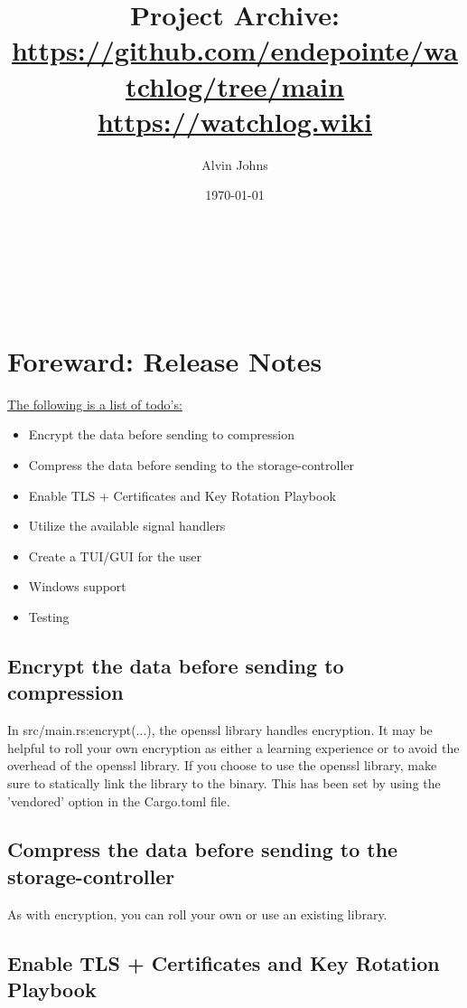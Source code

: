 \documentclass{article}
\title{Project Archive: \vspace{0.25cm} \\
\underline{\url{https://github.com/endepointe/watchlog/tree/main}} \vspace{0.25cm} \\
\underline{\url{https://watchlog.wiki}}}
\author{Alvin Johns}
\date{\today}
\makeatletter
\renewcommand{\maketitle}{
    \begin{titlepage}
        \centering
        \vspace*{\fill}
        \large \textbf{\@title} \\
        \vspace{0.5cm}
        \normalsize \textbf{\@author}\\
        \vspace{0.5cm}
        \normalsize \textbf{\@date} \\
        \vspace*{\fill}
    \end{titlepage}
}
\makeatother
\begin{document}
\maketitle

\newpage

\tableofcontents

\newpage

\raggedright

\section{Foreward: Release Notes}

\underline{The following is a list of todo's:}

\begin{itemize}[label=+]
    \item{Encrypt the data before sending to compression}
    \item{Compress the data before sending to the storage-controller}
    \item{Enable TLS + Certificates and Key Rotation Playbook}
    \item{Utilize the available signal handlers}
    \item{Create a TUI/GUI for the user}
    \item{Windows support}
    \item{Testing}
\end{itemize}

\subsection{Encrypt the data before sending to compression}

In src/main.rs:encrypt(...), the openssl library handles encryption. It may be helpful to roll your own encryption as either a learning experience or to avoid the overhead of the openssl library. If you choose to use the openssl library, make sure to statically link the library to the binary. This has been set by using the 'vendored' option in the Cargo.toml file.

\subsection{Compress the data before sending to the storage-controller}

As with encryption, you can roll your own or use an existing library.

\subsection{Enable TLS + Certificates and Key Rotation Playbook}
\end{document}

